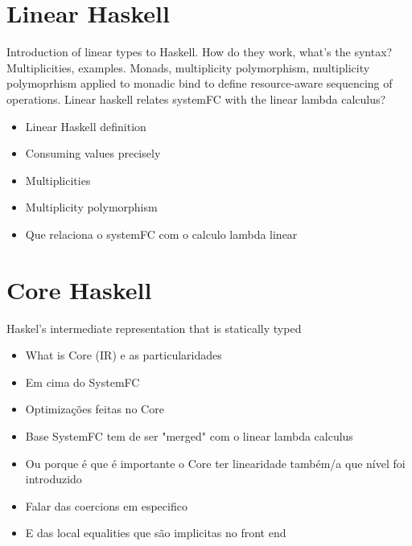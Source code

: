 \documentclass[]{lwnovathesis}
\begin{document}



\section{Linear Haskell\label{sec:linear-haskell}}

Introduction of linear types to Haskell. How do they work, what's the syntax?
Multiplicities, examples. Monads, multiplicity polymorphism, multiplicity
polymoprhism applied to monadic bind to define resource-aware sequencing of
operations. Linear haskell relates systemFC with the linear lambda calculus?

\begin{itemize}
    \item Linear Haskell definition
    \item Consuming values precisely
    \item Multiplicities
    \item Multiplicity polymorphism
    \item Que relaciona o systemFC com o calculo lambda linear
\end{itemize}

\section{Core Haskell\label{core-section}}

Haskel's intermediate representation that is statically typed

\begin{itemize}
    \item What is Core (IR) e as particularidades
    \item Em cima do SystemFC
    \item Optimizações feitas no Core
    \item Base SystemFC tem de ser "merged" com o linear lambda calculus
    \item Ou porque é que é importante o Core ter linearidade também/a que nível
        foi introduzido
    \item Falar das coercions em especifico
    \item E das local equalities que são implicitas no front end
\end{itemize}
\end{document}
